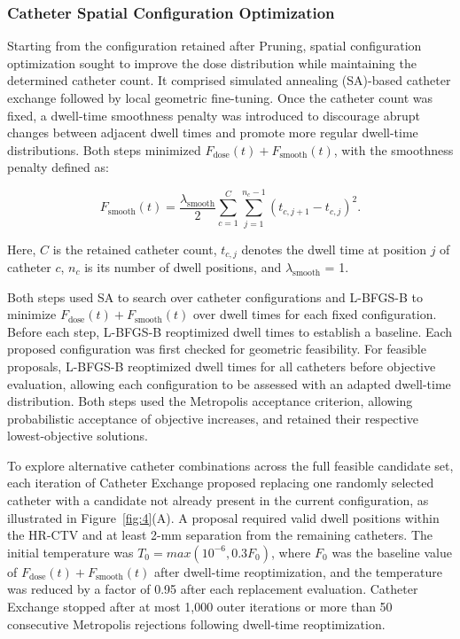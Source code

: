 \documentclass[12pt,twoside,letterpaper]{article}
\begin{document}
\subsubsection{Catheter Spatial Configuration Optimization}\label{sec:2-2-3}

Starting from the configuration retained after Pruning, spatial configuration optimization sought to improve the dose distribution while maintaining the determined catheter count. It comprised simulated annealing (SA)-based catheter exchange followed by local geometric fine-tuning. Once the catheter count was fixed, a dwell-time smoothness penalty was introduced to discourage abrupt changes between adjacent dwell times and promote more regular dwell-time distributions. Both steps minimized $F_{\text{dose}}\left( t \right) + F_{\text{smooth}}\left( t \right)$, with the smoothness penalty defined as:

\begin{equation}\label{eq:7}
F_{\text{smooth}}\left( t \right) = \frac{\lambda_{\text{smooth}}}{2}\sum_{c = 1}^{C}{\sum_{j = 1}^{n_{c} - 1}\left( t_{c,j + 1} - t_{c,j} \right)^{2}}.
\end{equation}

Here, $C$ is the retained catheter count, $t_{c,j}$ denotes the dwell time at position $j$ of catheter $c$, $n_{c}$ is its number of dwell positions, and $\lambda_{\text{smooth}}$ = 1.

Both steps used SA to search over catheter configurations and L-BFGS-B to minimize $F_{\text{dose}}\left( t \right) + F_{\text{smooth}}\left( t \right)$ over dwell times for each fixed configuration. Before each step, L-BFGS-B reoptimized dwell times to establish a baseline. Each proposed configuration was first checked for geometric feasibility. For feasible proposals, L-BFGS-B reoptimized dwell times for all catheters before objective evaluation, allowing each configuration to be assessed with an adapted dwell-time distribution. Both steps used the Metropolis acceptance criterion,\cite{ref78} allowing probabilistic acceptance of objective increases, and retained their respective lowest-objective solutions.

To explore alternative catheter combinations across the full feasible candidate set, each iteration of Catheter Exchange proposed replacing one randomly selected catheter with a candidate not already present in the current configuration, as illustrated in Figure~\ref{fig:4}(A). A proposal required valid dwell positions within the HR-CTV and at least 2-mm separation from the remaining catheters. The initial temperature was $T_{0} = max(10^{- 6},0.3F_{0})$, where $F_{0}$ was the baseline value of $F_{\text{dose}}\left( t \right) + F_{\text{smooth}}\left( t \right)$ after dwell-time reoptimization, and the temperature was reduced by a factor of 0.95 after each replacement evaluation. Catheter Exchange stopped after at most 1,000 outer iterations or more than 50 consecutive Metropolis rejections following dwell-time reoptimization.
\end{document}
